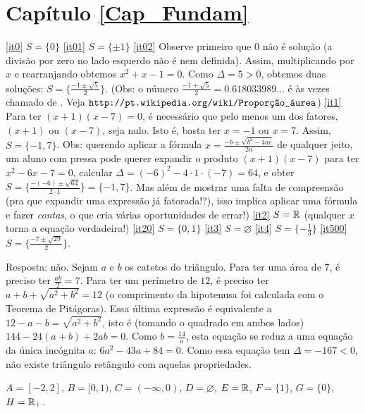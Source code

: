 \protect \section *{Capítulo \ref {Cap_Fundam}}
\begin{Solution}{1.1}
\eqref{it0} $S=\{0\}$
\eqref{it01} $S=\{\pm 1\}$
 \eqref{it02} Observe primeiro que $0$ não é solução (a divisão por zero no lado esquerdo
não é nem definida). Assim, multiplicando por $x$ e rearranjando obtemos $x^2+x-1=0$. Como
$\Delta=5>0$, obtemos duas soluções: $S=\{\tfrac{-1\pm \sqrt{5}}{2}\}$. (Obs: o número
$\tfrac{-1+\sqrt{5}}{2}=0.618033989...$ é às vezes chamado de . Veja
$\verb|http://pt.wikipedia.org/wiki/Proporção_áurea|$)
 \eqref{it1} Para ter $(x+1)(x-7)=0$, é necessário que pelo menos um dos fatores, $(x+1)$
ou $(x-7)$, seja nulo. Isto é, basta ter $x=-1$ ou $x=7$. Assim, $S=\{-1,7\}$. Obs:
querendo aplicar a fórmula $x=\frac{-b\pm\sqrt{b^2-4ac}}{2a}$ de qualquer jeito, um aluno
com pressa pode querer expandir o produto $(x+1)(x-7)$ para ter $x^2-6x-7=0$, calcular
$\Delta=(-6)^2-4\cdot 1\cdot (-7)=64$, e obter
$S=\{\frac{-(-6)\pm\sqrt{64}}{2\cdot 1}\}=\{-1,7\}$.
 Mas além de mostrar uma falta de compreensão (pra que expandir uma expressão já
fatorada!?), isso implica aplicar uma fórmula e fazer \emph{contas}, o que cria várias
oportunidades de errar!)
\eqref{it2} $S=\mathbb{R}$ (qualquer $x$ torna a equação verdadeira!)
 \eqref{it20} $S=\{0,1\}$
\eqref{it3} $S=\varnothing$
\eqref{it4} $S=\{-\tfrac13\}$
\eqref{it500} $S=\{\frac{-7\pm \sqrt{29}}{2}\}$.
\end{Solution}
\begin{Solution}{1.3}
 Resposta: não.
Sejam $a$ e $b$ os catetos do triângulo. Para ter uma área de $7$, é preciso ter
$\frac{ab}{2}=7$. Para ter um perímetro de $12$, é preciso ter $a+b+\sqrt{a^2+b^2}=12$
(o comprimento da hipotenusa foi calculada com o Teorema de Pitágoras).
Essa última expressão é equivalente a $12-a-b=\sqrt{a^2+b^2}$, isto é (tomando o quadrado
em ambos lados) $144-24(a+b)+2ab=0$. Como $b=\frac{14}{a}$, esta equação se reduz a uma
equação da única incógnita $a$: $6a^2-43a+84=0$. Como essa equação tem $\Delta=-167<0$,
não existe triângulo retângulo com aquelas propriedades.
\end{Solution}
\begin{Solution}{1.4}
$A=[-2,2]$, $B=[0,1)$, $C=(-\infty,0)$, $D=\varnothing$, $E=\mathbb{R}$, $F=\{1\}$, $G=\{0\}$,
$H=\mathbb{R}_+$.
\end{Solution}
